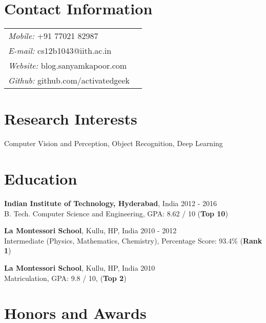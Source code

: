 \documentclass[margin,line]{res}
\begin{document}

\begin{resume}

\section{\sc Contact Information}

  \vspace{.05in}

  \begin{tabular}{@{}p{2.9in}p{6in}}
	{\it Mobile:}  +91 77021 82987 \\
	{\it E-mail:}  cs12b1043@iith.ac.in \\
	{\it Website:} blog.sanyamkapoor.com \\
	{\it Github:} github.com/activatedgeek
  \end{tabular}

\section{\sc Research Interests}
  Computer Vision and Perception, Object Recognition, Deep Learning

\section{\sc Education}

  {\bf Indian Institute of Technology, Hyderabad}, India \hfill 2012 - 2016 \\
  	B. Tech. Computer Science and Engineering,
	GPA: 8.62 / 10 ({\bf Top 10})

  \vspace*{-2.5mm}

  {\bf La Montessori School}, Kullu, HP, India \hfill 2010 - 2012 \\
	Intermediate (Physics, Mathematics, Chemistry),
    Percentage Score: 93.4\% ({\bf Rank 1})

  \vspace*{-2.5mm}

  {\bf La Montessori School}, Kullu, HP, India \hfill 2010 \\
	Matriculation,
    GPA: 9.8 / 10, ({\bf Top 2})

\section{\sc Honors and Awards}


\end{resume}
\end{document}

